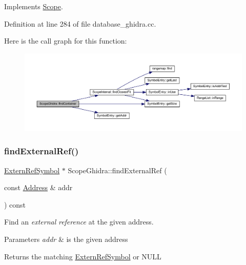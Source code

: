 Implements \mbox{\hyperlink{class_scope_a609fc1ef47d047717da65827e025cfdd}{Scope}}.



Definition at line 284 of file database\+\_\+ghidra.\+cc.

Here is the call graph for this function\+:
\nopagebreak
\begin{figure}[H]
\begin{center}
\leavevmode
\includegraphics[width=350pt]{class_scope_ghidra_a6b5b1b303d3d6adf93822224aa7bd19f_cgraph}
\end{center}
\end{figure}
\mbox{\label{class_scope_ghidra_a0de8e7d9e97f48516f8bb7b5edd4dfcd}} 
\subsubsection{\texorpdfstring{findExternalRef()}{findExternalRef()}}
{\footnotesize\ttfamily \mbox{\hyperlink{class_extern_ref_symbol}{Extern\+Ref\+Symbol}} $\ast$ Scope\+Ghidra\+::find\+External\+Ref (\begin{DoxyParamCaption}\item[{const \mbox{\hyperlink{class_address}{Address}} \&}]{addr }\end{DoxyParamCaption}) const\hspace{0.3cm}{\ttfamily [virtual]}}



Find an {\itshape external} {\itshape reference} at the given address. 


\begin{DoxyParams}{Parameters}
{\em addr} & is the given address \\
\hline
\end{DoxyParams}
\begin{DoxyReturn}{Returns}
the matching \mbox{\hyperlink{class_extern_ref_symbol}{Extern\+Ref\+Symbol}} or N\+U\+LL 
\end{DoxyReturn}



